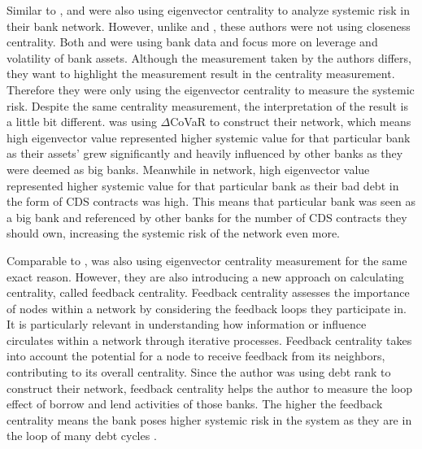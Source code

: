 \documentclass[a4paper,11pt]{article}
\begin{document}
Similar to \cite{Zhang_Yin_Sha_2023}, \cite{Duan_El_Ghoul_Guedhami_Li_Li_2020} and \cite{Markose_Giansante_Shaghaghi_2012} were also using eigenvector centrality to analyze systemic risk in their bank network. However, unlike \cite{Zhang_Yin_Sha_2023} and \cite{Lai_Hu_2021}, these authors were not using closeness centrality. Both \cite{Duan_El_Ghoul_Guedhami_Li_Li_2020} and \cite{Markose_Giansante_Shaghaghi_2012} were using bank data and focus more on leverage and volatility of bank assets. Although the measurement taken by the authors differs, they want to highlight the measurement result in the centrality measurement. Therefore they were only using the eigenvector centrality to measure the systemic risk. Despite the same centrality measurement, the interpretation of the result is a little bit different. \cite{Duan_El_Ghoul_Guedhami_Li_Li_2020} was using $\Delta$CoVaR to construct their network, which means high eigenvector value represented higher systemic value for that particular bank as their assets’ grew significantly and heavily influenced by other banks as they were deemed as big banks. Meanwhile in \cite{Markose_Giansante_Shaghaghi_2012} network, high eigenvector value represented higher systemic value for that particular bank as their bad debt in the form of CDS contracts was high. This means that particular bank was seen as a big bank and referenced by other banks for the number of CDS contracts they should own, increasing the systemic risk of the network even more.

Comparable to \cite{Markose_Giansante_Shaghaghi_2012}, \cite{Battiston_Puliga_Kaushik_Tasca_Caldarelli_2012} was also using eigenvector centrality measurement for the same exact reason. However, they are also introducing a new approach on calculating centrality, called feedback centrality. Feedback centrality assesses the importance of nodes within a network by considering the feedback loops they participate in. It is particularly relevant in understanding how information or influence circulates within a network through iterative processes. Feedback centrality takes into account the potential for a node to receive feedback from its neighbors, contributing to its overall centrality. Since the author was using debt rank to construct their network, feedback centrality helps the author to measure the loop effect of borrow and lend activities of those banks. The higher the feedback centrality means the bank poses higher systemic risk in the system as they are in the loop of many debt cycles \citep{Battiston_Puliga_Kaushik_Tasca_Caldarelli_2012}.
\end{document}
